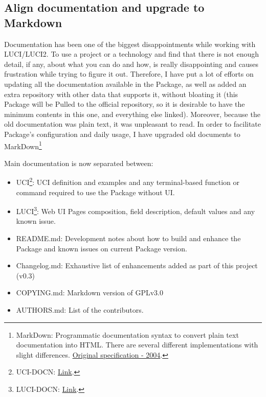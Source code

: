 \subsection{Align documentation and upgrade to Markdown}
Documentation has been one of the biggest disappointments while working with LUCI/LUCI2. To use a project or a technology and find that there is not enough detail, if any, about what you can do and how, is really disappointing and causes frustration while trying to figure it out. Therefore, I have put a lot of efforts on updating all the documentation available in the Package, as well as added an extra repository with other data that supports it, without bloating it (this Package will be Pulled to the official repository, so it is desirable to have the minimum contents in this one, and everything else linked). Moreover, because the old documentation was plain text, it was unpleasant to read. In order to facilitate Package's configuration and daily usage, I have upgraded old documents to MarkDown\footnote{MarkDown: Programmatic documentation syntax to convert plain text documentation into HTML. There are several different implementations with slight differences. \href{https://daringfireball.net/projects/markdown/}{Original specification - 2004}.}

Main documentation is now separated between:
\begin{itemize}
    \item UCI\footnote{UCI-DOCN: \href{https://github.com/eloicaso/bird-openwrt/blob/master/UCI-DOCUMENTATION.md}{Link}.}: UCI definition and examples and any terminal-based function or command required to use the Package without UI.
    \item  LUCI\footnote{LUCI-DOCN: \href{https://github.com/eloicaso/bird-openwrt/blob/master/LUCI-DOCUMENTATION.md}{Link}.}: Web UI Pages composition, field description, default values and any known issue.
    \item README.md: Development notes about how to build and enhance the Package and known issues on current Package version.
    \item Changelog.md: Exhaustive list of enhancements added as part of this project (v0.3)
    \item COPYING.md: Markdown version of GPLv3.0
    \item AUTHORS.md: List of the contributors.
\end{itemize}

